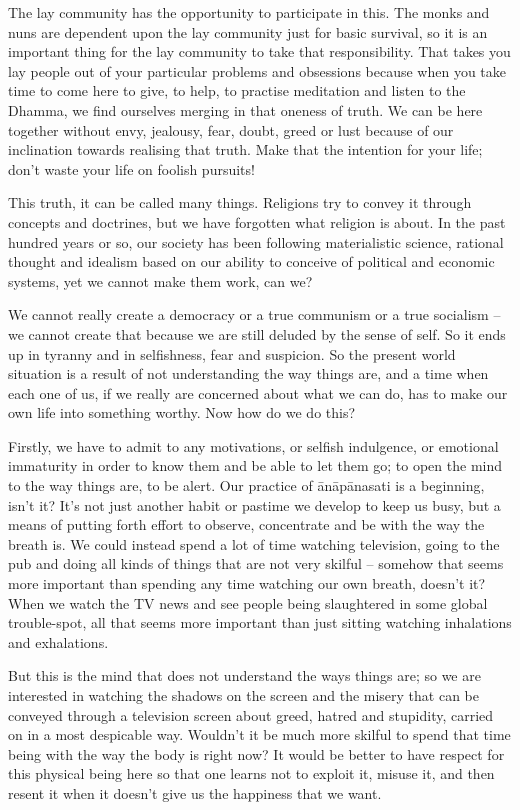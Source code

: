 The lay community has the opportunity to participate in this. The monks and nuns are dependent upon the lay community just for basic survival, so it is an important thing for the lay community to take that responsibility. That takes you lay people out of your particular problems and obsessions because when you take time to come here to give, to help, to practise meditation and listen to the Dhamma, we find ourselves merging in that oneness of truth. We can be here together without envy, jealousy, fear, doubt, greed or lust because of our inclination towards realising that truth. Make that the intention for your life; don't waste your life on foolish pursuits!

This truth, it can be called many things. Religions try to convey it through concepts and doctrines, but we have forgotten what religion is about. In the past hundred years or so, our society has been following materialistic science, rational thought and idealism based on our ability to conceive of political and economic systems, yet we cannot make them work, can we?

We cannot really create a democracy or a true communism or a true socialism -- we cannot create that because we are still deluded by the sense of self. So it ends up in tyranny and in selfishness, fear and suspicion. So the present world situation is a result of not understanding the way things are, and a time when each one of us, if we really are concerned about what we can do, has to make our own life into something worthy. Now how do we do this?

Firstly, we have to admit to any motivations, or selfish indulgence, or emotional immaturity in order to know them and be able to let them go; to open the mind to the way things are, to be alert. Our practice of ānāpānasati is a beginning, isn't it? It's not just another habit or pastime we develop to keep us busy, but a means of putting forth effort to observe, concentrate and be with the way the breath is. We could instead spend a lot of time watching television, going to the pub and doing all kinds of things that are not very skilful -- somehow that seems more important than spending any time watching our own breath, doesn't it? When we watch the TV news and see people being slaughtered in some global trouble-spot, all that seems more important than just sitting watching inhalations and exhalations.

But this is the mind that does not understand the ways things are; so we are interested in watching the shadows on the screen and the misery that can be conveyed through a television screen about greed, hatred and stupidity, carried on in a most despicable way. Wouldn't it be much more skilful to spend that time being with the way the body is right now? It would be better to have respect for this physical being here so that one learns not to exploit it, misuse it, and then resent it when it doesn't give us the happiness that we want.

